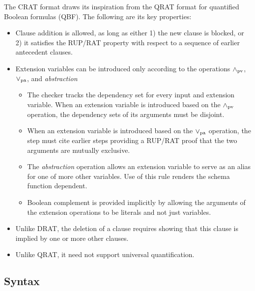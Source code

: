 \documentclass{llncs}
\newcommand{\pand}{\mathbin{\land_{\rm pv}}}
\newcommand{\por}{\mathbin{\lor_{\rm pa}}}
\begin{document}
The CRAT format draws its inspiration from the QRAT format for
quantified Boolean formulas (QBF).  The following are its key properties:
\begin{itemize}
\item Clause addition is allowed, as long as either 1) the new clause is
  blocked, or 2) it satisfies the RUP/RAT property with respect to a sequence
  of earlier antecedent clauses.
\item  Extension variables can be introduced only according to the operations $\pand$, $\por$, and {\em abstraction}
\begin{itemize}
\item The checker tracks the dependency set for every input and
  extension variable.  When an extension variable is introduced based
  on the $\pand$ operation, the dependency sets of its arguments must
  be disjoint.
\item When an extension variable is introduced based on the $\por$
  operation, the step must cite earlier steps providing a RUP/RAT proof
  that the two arguments are mutually exclusive.
\item The {\em abstraction} operation allows an extension
  variable to serve as an alias for one of more other 
  variables.  Use of this rule renders the schema function dependent.
\item Boolean complement is provided implicitly by allowing the
  arguments of the extension operations to be literals and not just
  variables.
\end{itemize}
\item Unlike DRAT, the deletion of a clause requires showing that this clause is implied by one or more other clauses.
\item Unlike QRAT, it need not support universal quantification.
\end{itemize}

\subsection{Syntax}
\end{document}
